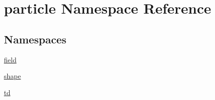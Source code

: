 \hypertarget{namespaceparticle}{}\section{particle Namespace Reference}
\label{namespaceparticle}
\subsection*{Namespaces}
\begin{DoxyCompactItemize}
\item 
 \hyperlink{namespaceparticle_1_1field}{field}
\item 
 \hyperlink{namespaceparticle_1_1shape}{shape}
\item 
 \hyperlink{namespaceparticle_1_1td}{td}
\end{DoxyCompactItemize}
